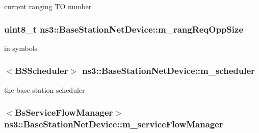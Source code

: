 current ranging TO number 

\subsubsection[{\texorpdfstring{m\+\_\+rang\+Req\+Opp\+Size}{m_rangReqOppSize}}]{\setlength{\rightskip}{0pt plus 5cm}uint8\+\_\+t ns3\+::\+Base\+Station\+Net\+Device\+::m\+\_\+rang\+Req\+Opp\+Size\hspace{0.3cm}{\ttfamily [private]}}\hypertarget{classns3_1_1BaseStationNetDevice_ac4c3cce8984b95e8c708b0402cc697fc}{}\label{classns3_1_1BaseStationNetDevice_ac4c3cce8984b95e8c708b0402cc697fc}


in symbols 

\subsubsection[{\texorpdfstring{m\+\_\+scheduler}{m_scheduler}}]{$<${\bf B\+S\+Scheduler}$>$ ns3\+::\+Base\+Station\+Net\+Device\+::m\+\_\+scheduler\hspace{0.3cm}{\ttfamily [private]}}\hypertarget{classns3_1_1BaseStationNetDevice_ae25a05b8fbaed29fd59277f928683a16}{}\label{classns3_1_1BaseStationNetDevice_ae25a05b8fbaed29fd59277f928683a16}


the base station scheduler 

\subsubsection[{\texorpdfstring{m\+\_\+service\+Flow\+Manager}{m_serviceFlowManager}}]{$<${\bf Bs\+Service\+Flow\+Manager}$>$ ns3\+::\+Base\+Station\+Net\+Device\+::m\+\_\+service\+Flow\+Manager\hspace{0.3cm}{\ttfamily [private]}}\hypertarget{classns3_1_1BaseStationNetDevice_a7ba16e6369f37b75fd026bf70561c6e9}{}\label{classns3_1_1BaseStationNetDevice_a7ba16e6369f37b75fd026bf70561c6e9}


